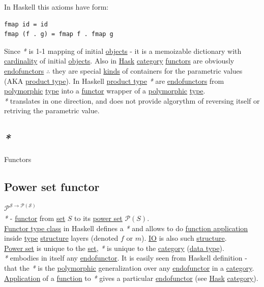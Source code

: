 \documentclass[a4paper,14pt,oneside]{book}
\begin{document}
In Haskell this axioms have form:\\
\begin{verbatim}
fmap id = id
fmap (f . g) = fmap f . fmap g
\end{verbatim}

Since \emph{*} is 1-1 mapping of initial \hyperref[org67f2abd]{objects} - it is a memoizable dictionary with \hyperref[orgfba6c0d]{cardinality} of initial \hyperref[org67f2abd]{objects}. Also in \hyperref[org8f4b63e]{Hask} \hyperref[org3a5c6d7]{category} \hyperref[org8f42943]{functors} are obviously \hyperref[orgbe03043]{endofunctors} \(\therefore\) they are special \hyperref[org7010d09]{kinds} of containers for the parametric values (AKA \hyperref[orgd84b504]{product type}). In Haskell \hyperref[orgd84b504]{product type} \emph{*} are \hyperref[orgbe03043]{endofunctors} from \hyperref[orga6475c9]{polymorphic} \hyperref[org35b9249]{type} into a \hyperref[orgd17eb6d]{functor} wrapper of a \hyperref[orga6475c9]{polymorphic} \hyperref[org35b9249]{type}.\\

\emph{*} translates in one direction, and does not provide algorythm of reversing itself or retriving the parametric value.\\

\subsection{\emph{*}}
\label{sec:org0ab75e4}

\label{org8f42943}Functors\\

\subsection{\label{orgaafac5b}Power set functor}
\label{sec:orgf47f2d6}
\(\mathcal{P^{S \to P(S)}}\)\\

\emph{*} - \hyperref[orgd17eb6d]{functor} from \hyperref[orgc6fbcf3]{set} \(S\) to its \hyperref[orgb767f84]{power set} \(\mathcal{P}(S)\).\\

\hyperref[orgcf43743]{Functor type class} in Haskell defines a \emph{*} and allows to do \hyperref[orgb408abd]{function application} inside \hyperref[org35b9249]{type} \hyperref[orgffe6855]{structure} layers (denoted \(f\) or \(m\)). \hyperref[orgb38a1fb]{IO} is also such \hyperref[orgffe6855]{structure}.\\
\hyperref[orgb767f84]{Power set} is unique to the \hyperref[orgc6fbcf3]{set}, \emph{*} is unique to the \hyperref[org3a5c6d7]{category} (\hyperref[org5fd92b4]{data type}).\\
\emph{*} embodies in itself any \hyperref[org2d18cf9]{endofunctor}. It is easily seen from Haskell definition - that the \emph{*} is the \hyperref[orga6475c9]{polymorphic} generalization over any \hyperref[org2d18cf9]{endofunctor} in a \hyperref[org3a5c6d7]{category}. \hyperref[orgf3301f1]{Application} of a \hyperref[org9530a6b]{function} to \emph{*} gives a particular \hyperref[org2d18cf9]{endofunctor} (see \hyperref[org8f4b63e]{Hask} \hyperref[org3a5c6d7]{category}).\\
\end{document}
